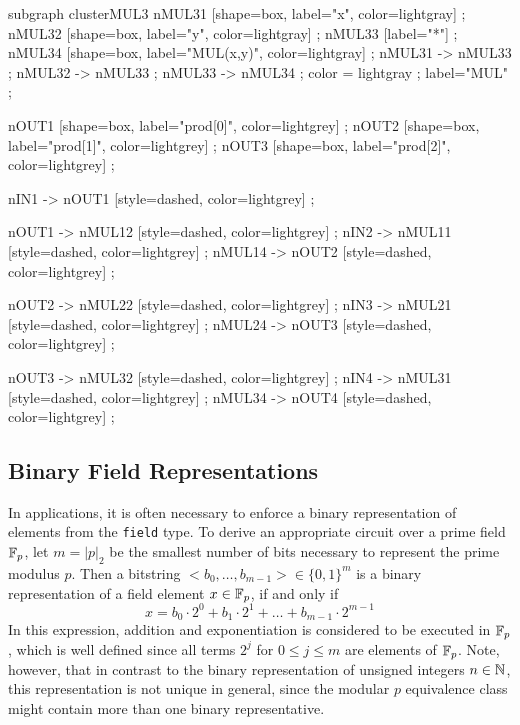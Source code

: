 \begin{example}
\begin{center}
{    subgraph clusterMUL3 {
    nMUL31 [shape=box, label="x", color=lightgray] ;
    nMUL32 [shape=box, label="y", color=lightgray] ;
    nMUL33 [label="*"] ;
    nMUL34 [shape=box, label="MUL(x,y)", color=lightgray] ;
    nMUL31 -> nMUL33 ;
    nMUL32 -> nMUL33 ;
    nMUL33 -> nMUL34 ;
    color = lightgray ;
    label="MUL" ;
  }

  nOUT1 [shape=box, label="prod[0]", color=lightgrey] ;
  nOUT2 [shape=box, label="prod[1]", color=lightgrey] ;
  nOUT3 [shape=box, label="prod[2]", color=lightgrey] ;
  
  nIN1 -> nOUT1 [style=dashed, color=lightgrey] ;
  
  nOUT1 -> nMUL12 [style=dashed, color=lightgrey] ;
  nIN2 -> nMUL11 [style=dashed, color=lightgrey] ;
  nMUL14 -> nOUT2 [style=dashed, color=lightgrey] ;
 
  nOUT2 -> nMUL22 [style=dashed, color=lightgrey] ;
  nIN3 -> nMUL21 [style=dashed, color=lightgrey] ;
  nMUL24 -> nOUT3 [style=dashed, color=lightgrey] ; 
  
  nOUT3 -> nMUL32 [style=dashed, color=lightgrey] ;
  nIN4 -> nMUL31 [style=dashed, color=lightgrey] ;
  nMUL34 -> nOUT4 [style=dashed, color=lightgrey] ;  
  
}
\end{center}
\end{example}
\subsection{Binary Field Representations} In applications, it is often necessary to enforce a binary representation of elements from the \texttt{field} type. To derive an appropriate circuit over a prime field $\mathbb{F}_p$, let $m=|p|_2$ be the smallest number of bits necessary to represent the prime modulus $p$. Then a bitstring $<b_0,\ldots,b_{m-1}>\in \{0,1\}^m$ is a binary representation of a field element $x\in\mathbb{F}_p$, if and only if
\begin{equation}
\label{def:binary_field_rep}
x = b_0\cdot 2^0 + b_1\cdot 2^1 + \ldots + b_{m-1}\cdot 2^{m-1}
\end{equation}
In this expression, addition and exponentiation is considered to be
executed in $\mathbb{F}_p$, which is well defined since all terms $2^j$ for
$0 \leq j \leq m$ are elements of $\mathbb{F}_p$. Note, however, that in
contrast to the binary representation of unsigned integers $n\in\mathbb{N}$,
this representation is not unique in general, since the modular $p$
equivalence class might contain more than one binary representative.

